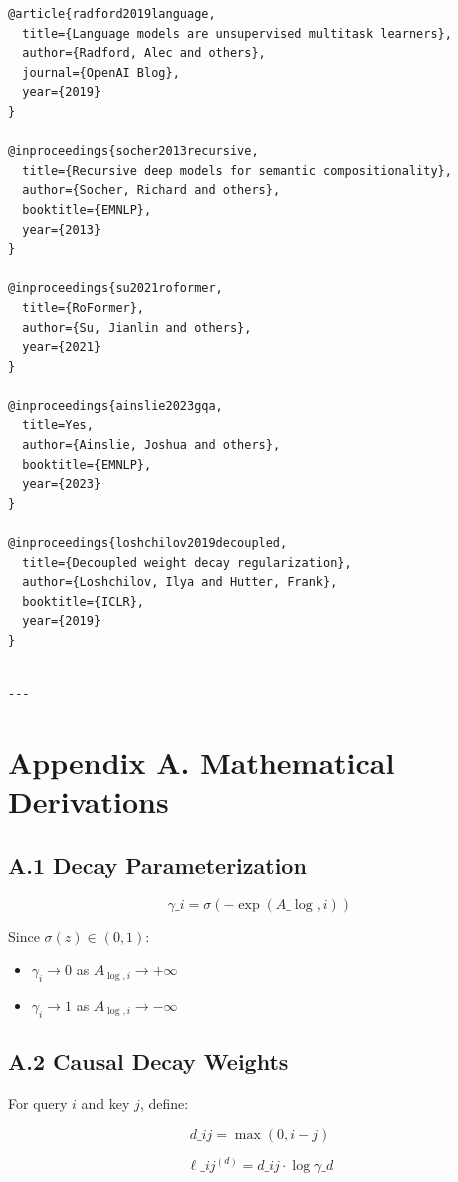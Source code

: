 \begin{lstlisting}
@article{radford2019language,
  title={Language models are unsupervised multitask learners},
  author={Radford, Alec and others},
  journal={OpenAI Blog},
  year={2019}
}

@inproceedings{socher2013recursive,
  title={Recursive deep models for semantic compositionality},
  author={Socher, Richard and others},
  booktitle={EMNLP},
  year={2013}
}

@inproceedings{su2021roformer,
  title={RoFormer},
  author={Su, Jianlin and others},
  year={2021}
}

@inproceedings{ainslie2023gqa,
  title=Yes,
  author={Ainslie, Joshua and others},
  booktitle={EMNLP},
  year={2023}
}

@inproceedings{loshchilov2019decoupled,
  title={Decoupled weight decay regularization},
  author={Loshchilov, Ilya and Hutter, Frank},
  booktitle={ICLR},
  year={2019}
}
\end{lstlisting}
\begin{lstlisting}

---
\end{lstlisting}

\section{Appendix A. Mathematical Derivations}

\subsection{A.1 Decay Parameterization}

\[
\gamma\_i = \sigma(-\exp(A\_{\log, i}))
\tag{A.1}
\]

Since $\sigma(z) \in (0, 1)$:
\begin{itemize}
\item $\gamma_i \to 0$ as $A_{\log, i} \to +\infty$
\item $\gamma_i \to 1$ as $A_{\log, i} \to -\infty$

\end{itemize}
\subsection{A.2 Causal Decay Weights}

For query $i$ and key $j$, define:

\[
d\_{ij} = \max(0, i - j)
\tag{A.2}
\]

\[
\ell\_{ij}^{(d)} = d\_{ij} \cdot \log \gamma\_d
\tag{A.3}
\]

